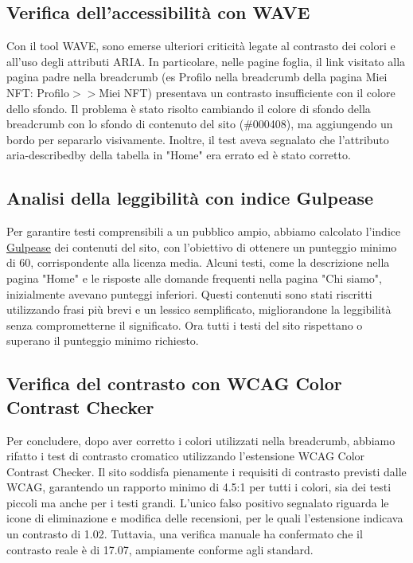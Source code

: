 \documentclass[10pt]{article}
\begin{document}
\subsection{Verifica dell’accessibilità con WAVE}
Con il tool WAVE, sono emerse ulteriori criticità legate al contrasto dei colori e all’uso degli attributi ARIA. In particolare, nelle pagine foglia, il link visitato alla pagina padre nella breadcrumb (es Profilo nella breadcrumb della pagina Miei NFT: Profilo$>>$Miei NFT) presentava un contrasto insufficiente con il colore dello sfondo. Il problema è stato risolto cambiando il colore di sfondo della breadcrumb con lo sfondo di contenuto del sito (\#000408), ma aggiungendo un bordo per separarlo visivamente. Inoltre, il test aveva segnalato che l’attributo aria-describedby della tabella in "Home" era errato ed è stato corretto.

\subsection{Analisi della leggibilità con indice Gulpease}
Per garantire testi comprensibili a un pubblico ampio, abbiamo calcolato l’indice \underline{\href{https://farfalla-project.org/readability_static/}{Gulpease}} dei contenuti del sito, con l’obiettivo di ottenere un punteggio minimo di 60, corrispondente alla licenza media. Alcuni testi, come la descrizione nella pagina "Home" e le risposte alle domande frequenti nella pagina "Chi siamo", inizialmente avevano punteggi inferiori. Questi contenuti sono stati riscritti utilizzando frasi più brevi e un lessico semplificato, migliorandone la leggibilità senza comprometterne il significato. Ora tutti i testi del sito rispettano o superano il punteggio minimo richiesto.

\subsection{Verifica del contrasto con WCAG Color Contrast Checker}
Per concludere, dopo aver corretto i colori utilizzati nella breadcrumb, abbiamo rifatto i test di contrasto cromatico utilizzando l’estensione WCAG Color Contrast Checker. Il sito soddisfa pienamente i requisiti di contrasto previsti dalle WCAG, garantendo un rapporto minimo di 4.5:1 per tutti i colori, sia dei testi piccoli ma anche per i testi grandi.
L’unico falso positivo segnalato riguarda le icone di eliminazione e modifica delle recensioni, per le quali l’estensione indicava un contrasto di 1.02. Tuttavia, una verifica manuale ha confermato che il contrasto reale è di 17.07, ampiamente conforme agli standard.
\end{document}
